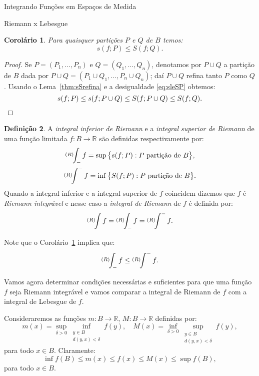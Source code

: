 \documentclass[oneside,final,11pt]{amsbook}
\newcommand{\R}{\mathds R}
\newcommand{\intinfd}{\raise2pt\hbox{$\scriptstyle(R)$}\!\!\int_-}
\newcommand{\intsupd}{\raise2pt\hbox{$\scriptstyle(R)$}\!\!\int^-}
\newcommand{\intRd}{\raise2pt\hbox{$\scriptstyle(R)$}\!\!\int}
\newcommand{\intinf}{\raise2pt\hbox{$\scriptscriptstyle(R)$}\!\int_-}
\newcommand{\intsup}{\raise2pt\hbox{$\scriptscriptstyle(R)$}\!\int^-}
\newcommand{\intR}{\raise2pt\hbox{$\scriptscriptstyle(R)$}\!\int}
\theoremstyle{remark}\newtheorem{exercise}{Exercício}[chapter]
\theoremstyle{remark}\newtheorem{*exercise}[exercise]{\hbox to 0pt{\hskip 0pt minus 1fil*}Exercício}
\theoremstyle{definition}\newtheorem{exdefin}{Definição}[chapter]
\theoremstyle{plain}\newtheorem{teo}{Teorema}[section]
\theoremstyle{plain}\newtheorem{lem}[teo]{Lema}
\theoremstyle{plain}\newtheorem{prop}[teo]{Proposição}
\theoremstyle{plain}\newtheorem{cor}[teo]{Corolário}
\theoremstyle{definition}\newtheorem{defin}[teo]{Definição}
\theoremstyle{remark}\newtheorem{rem}[teo]{Observação}
\theoremstyle{definition}\newtheorem{notation}[teo]{Notação}
\theoremstyle{definition}\newtheorem{convention}[teo]{Convenção}
\theoremstyle{definition}\newtheorem{example}[teo]{Exemplo}
\numberwithin{section}{chapter}
\numberwithin{equation}{section}
\begin{document}
\begin{chapter}{Integrando Funções em Espaços de Medida}
\begin{section}{Riemann x Lebesgue}
\begin{cor}\label{thm:corsfPSfQ}
Para quaisquer partições $P$ e $Q$ de $B$ temos:
\[s(f;P)\le S(f;Q).\]
\end{cor}
\begin{proof}
Se $P=(P_1,\ldots,P_n)$ e $Q=(Q_1,\ldots,Q_n)$, denotamos por $P\cup Q$ a partição de $B$
dada por $P\cup Q=(P_1\cup Q_1,\ldots,P_n\cup Q_n)$; daí $P\cup Q$ refina tanto $P$ como $Q$.
Usando o Lema~\ref{thm:sSrefina} e a desigualdade \eqref{eq:sleSP} obtemos:
\[s(f;P)\le s(f;P\cup Q)\le S(f;P\cup Q)\le S(f;Q).\qedhere\]
\end{proof}

\begin{defin}\label{thm:defintRiemann}
A {\em integral inferior de Riemann\/}
e a {\em integral superior de Riemann\/}
de uma função
limitada $f:B\to\R$ são definidas respectivamente por:\index[simbolos]{$\intinf f$}\index[simbolos]{$\intsup f$}
\begin{gather*}
\intinfd f=\sup\big\{s(f;P):\text{$P$ partição de $B$}\big\},\\
\intsupd f=\inf\big\{S(f;P):\text{$P$ partição de $B$}\big\}.
\end{gather*}
Quando a integral inferior e a integral superior de $f$ coincidem dizemos que $f$ é
{\em Riemann integrável\/}
e nesse caso a {\em integral de Riemann\/}
de $f$ é definida por:\index[simbolos]{$\intR f$}
\[\intRd f=\intinfd f=\intsupd f.\]
\end{defin}
Note que o Corolário~\ref{thm:corsfPSfQ} implica que:
\[\intinfd f\le\intsupd f.\]

Vamos agora determinar condições necessárias e suficientes para que uma função $f$
seja Riemann integrável e vamos comparar a integral de Riemann de $f$ com a integral
de Lebesgue de $f$.

Consideraremos as funções $m:B\to\R$, $M:B\to\R$ definidas por:
\[m(x)=\sup_{\delta>0}\!\inf_{\substack{y\in B\\d(y,x)<\delta}}\!\!f(y),\quad
M(x)=\inf_{\delta>0}\!\sup_{\substack{y\in B\\d(y,x)<\delta}}\!\!f(y),\]
para todo $x\in B$. Claramente:
\begin{equation}\label{eq:mfM}
\inf f(B)\le m(x)\le f(x)\le M(x)\le\sup f(B),
\end{equation}
para todo $x\in B$.


\end{section}
\end{chapter}
\end{document}
